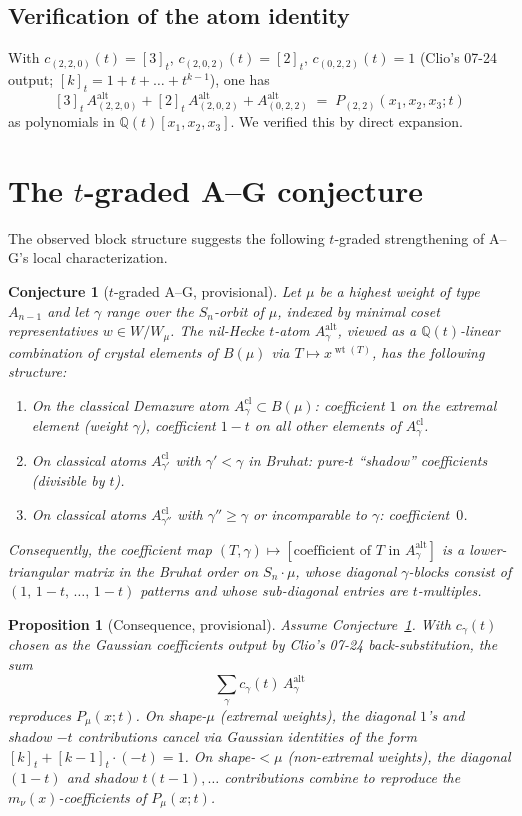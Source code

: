 \documentclass[11pt]{article}
\newtheorem{proposition}[theorem]{Proposition}
\newtheorem{conjecture}[theorem]{Conjecture}
\theoremstyle{definition}
\newcommand{\wt}{\operatorname{wt}}
\newcommand{\Aalt}{A^{\mathrm{alt}}}
\begin{document}
\subsection*{Verification of the atom identity}

With $c_{(2,2,0)}(t) = [3]_t$, $c_{(2,0,2)}(t) = [2]_t$, $c_{(0,2,2)}(t) = 1$ (Clio's 07-24 output; $[k]_t = 1 + t + \dots + t^{k-1}$), one has
\[
[3]_t\, \Aalt_{(2,2,0)} + [2]_t\, \Aalt_{(2,0,2)} + \Aalt_{(0,2,2)} \;=\; P_{(2,2)}(x_1,x_2,x_3; t)
\]
as polynomials in $\mathbb{Q}(t)[x_1,x_2,x_3]$. We verified this by direct expansion.

\section{The $t$-graded A--G conjecture}

The observed block structure suggests the following $t$-graded strengthening of A--G's local characterization.

\begin{conjecture}[$t$-graded A--G, provisional]\label{conj:tAG}
Let $\mu$ be a highest weight of type $A_{n-1}$ and let $\gamma$ range over the $S_n$-orbit of $\mu$, indexed by minimal coset representatives $w \in W/W_\mu$. The nil-Hecke $t$-atom $\Aalt_\gamma$, viewed as a $\mathbb{Q}(t)$-linear combination of crystal elements of $B(\mu)$ via $T \mapsto x^{\wt(T)}$, has the following structure:
\begin{enumerate}
\item[\rm(a)] On the classical Demazure atom $A^{\mathrm{cl}}_\gamma \subset B(\mu)$: coefficient $1$ on the extremal element (weight $\gamma$), coefficient $1-t$ on all other elements of $A^{\mathrm{cl}}_\gamma$.
\item[\rm(b)] On classical atoms $A^{\mathrm{cl}}_{\gamma'}$ with $\gamma' < \gamma$ in Bruhat: pure-$t$ ``shadow'' coefficients (divisible by $t$).
\item[\rm(c)] On classical atoms $A^{\mathrm{cl}}_{\gamma''}$ with $\gamma'' \ge \gamma$ or incomparable to $\gamma$: coefficient~$0$.
\end{enumerate}
Consequently, the coefficient map $(T,\gamma) \mapsto [\text{coefficient of }T\text{ in }\Aalt_\gamma]$ is a lower-triangular matrix in the Bruhat order on $S_n\cdot\mu$, whose diagonal $\gamma$-blocks consist of $(1,\,1-t,\,\dots,\,1-t)$ patterns and whose sub-diagonal entries are $t$-multiples.
\end{conjecture}

\begin{proposition}[Consequence, provisional]\label{prop:tAGconsequence}
Assume Conjecture~\ref{conj:tAG}. With $c_\gamma(t)$ chosen as the Gaussian coefficients output by Clio's 07-24 back-substitution, the sum
\[
\sum_\gamma c_\gamma(t)\, \Aalt_\gamma
\]
reproduces $P_\mu(x; t)$. On shape-$\mu$ (extremal weights), the diagonal $1$'s and shadow $-t$ contributions cancel via Gaussian identities of the form $[k]_t + [k-1]_t \cdot (-t) = 1$. On shape-$<\mu$ (non-extremal weights), the diagonal $(1-t)$ and shadow $t(t-1),\dots$ contributions combine to reproduce the $m_\nu(x)$-coefficients of $P_\mu(x;t)$.
\end{proposition}
\end{document}
